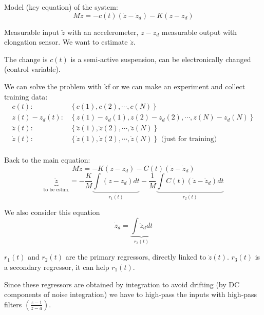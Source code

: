 \begin{example}
    Model (key equation) of the system:
    \[
        M\ddot{z} = -c(t)(\dot{z}-\dot{z}_d) - K(z-z_d)
    \]

    Measurable input $\ddot{z}$ with an accelerometer, $z-z_d$ measurable output with elongation sensor.
    We want to estimate $\dot{z}$.

    The change is $c(t)$ is a semi-active suspension, can be electronically changed (control variable).

    We can solve the problem with \gls{kf} or we can make an experiment and collect training data:
    \begin{align*}
        c(t)        : & \left\{ c(1), c(2), \cdots, c(N) \right\} \\
        z(t)-z_d(t) : & \left\{ z(1)-z_d(1), z(2)-z_d(2), \cdots, z(N)-z_d(N) \right\} \\
        \ddot{z}(t) : & \left\{ \ddot{z}(1), \ddot{z}(2), \cdots, \ddot{z}(N) \right\} \\
        \dot{z}(t)  : & \left\{ \dot{z}(1), \dot{z}(2), \cdots, \dot{z}(N) \right\} \text{ (just for training)} \\
    \end{align*}


    Back to the main equation:
    \[
        M\ddot{z} = -K(z-z_d)-C(t)(\dot{z}-\dot{z}_d)
    \]
    \[
        \underbrace{\dot{z}}_{\text{to be estim.}} =
        -\frac{K}{M} \underbrace{\int (z-z_d)dt}_{r_1(t)}
        -\frac{1}{M} \underbrace{\int C(t)(\dot{z}-\dot{z}_d)dt}_{r_2(t)}
    \]

    We also consider this equation
    \[
        \dot{z}_d = \underbrace{\int \ddot{z}_d dt}_{r_3(t)}
    \]

    $r_1(t)$ and $r_2(t)$ are the primary regressors, directly linked to $\dot{z}(t)$. $r_3(t)$ is a secondary regressor, it can help $r_1(t)$.

    Since these regressors are obtained by integration to avoid drifting (by DC components of noise integration) we have to high-pass the inputs with high-pass filters $\left(\frac{z-1}{z-a}\right)$.


\end{example}
